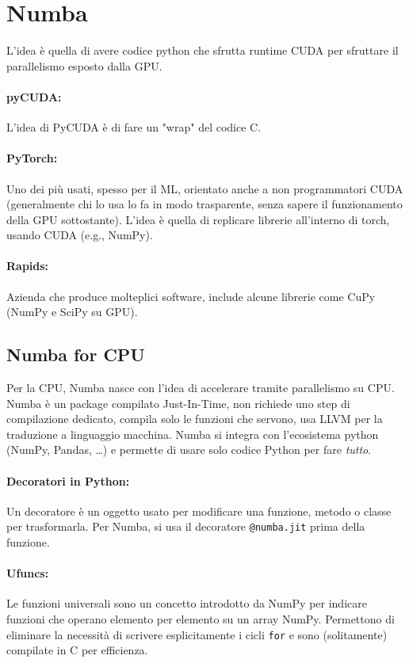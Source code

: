 \section{Numba}

L'idea è quella di avere codice python che sfrutta runtime CUDA per sfruttare il parallelismo esposto dalla GPU.

\paragraph{pyCUDA:} L'idea di PyCUDA è di fare un "wrap" del codice C.

\paragraph{PyTorch:} Uno dei più usati, spesso per il ML, orientato anche a non programmatori CUDA (generalmente chi lo usa lo fa in modo trasparente, senza sapere il funzionamento della GPU sottostante). L'idea è quella di replicare librerie all'interno di torch, usando CUDA (e.g., NumPy).

\paragraph{Rapids:} Azienda che produce molteplici software, include alcune librerie come CuPy (NumPy e SciPy su GPU). 

\subsection{Numba for CPU}

Per la CPU, Numba nasce con l'idea di accelerare tramite parallelismo su CPU.  Numba è un package compilato Just-In-Time, non richiede uno step di compilazione dedicato, compila solo le funzioni che servono, usa LLVM per la traduzione a linguaggio macchina. Numba si integra con l'ecosistema python (NumPy, Pandas, \dots) e permette di usare solo codice Python per fare \textit{tutto}.

\paragraph{Decoratori in Python:} Un decoratore è un oggetto usato per modificare una funzione, metodo o classe per trasformarla. Per Numba, si usa il decoratore \texttt{@numba.jit} prima della funzione. 

\paragraph{Ufuncs:} Le funzioni universali sono un concetto introdotto da NumPy per indicare funzioni che operano elemento per elemento su un array NumPy. Permettono di eliminare la necessità di scrivere esplicitamente i cicli \texttt{for} e sono (solitamente) compilate in C per efficienza. 

